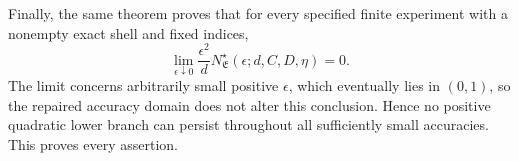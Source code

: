 Finally, the same theorem proves that for every specified finite experiment with a nonempty exact shell and fixed indices,
\[
\lim_{\epsilon\downarrow0}\frac{\epsilon^2}{d}N^\star_{\mathfrak E}(\epsilon;d,C,D,\eta)=0.
\]
The limit concerns arbitrarily small positive \(\epsilon\), which eventually lies in \((0,1)\), so the repaired accuracy domain does not alter this conclusion. Hence no positive quadratic lower branch can persist throughout all sufficiently small accuracies. This proves every assertion.